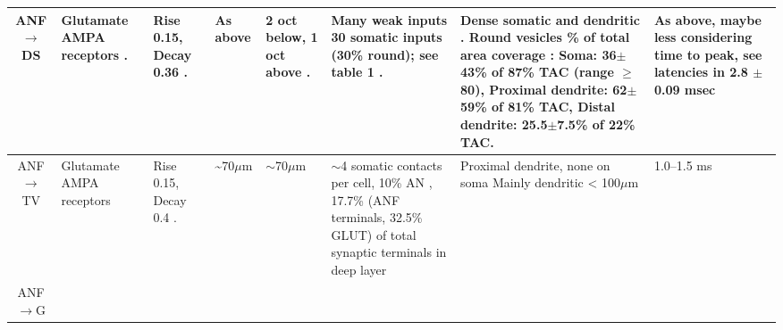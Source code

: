 \begin{longtable}{cYYYYYYY}
\\ \midrule
ANF\ensuremath{\rightarrow}DS                   
& %
Glutamate AMPA receptors \citep{FerragamoGoldingEtAl:1998a,WentholdHunterEtAl:1993}.
& %
Rise 0.15, Decay 0.36 \citep{GardnerTrussellEtAl:1999,Oertel:1983}.  
& %
As above
& %
2 oct below, 1 oct above \citep{PalmerJiangEtAl:1996}. 
& %
Many weak inputs \citep{FerragamoGoldingEtAl:1998a} 
30 somatic inputs (30\% round); see table 1 \citep{SmithRhode:1989}.
& %
Dense somatic and dendritic \citep{Cant:1981,Cant:1982,RyugoWrightEtAl:1993}.
Round vesicles \% of total area coverage \citep[cat][]{SmithRhode:1989}:
Soma: 36$\pm$43\%  of 87\% TAC (range $\geq$80), 
Proximal dendrite: 62$\pm$59\%  of 81\% TAC, 
Distal dendrite: 25.5$\pm$7.5\%  of 22\% TAC. 
& %
As above, maybe less considering time to peak,
see latencies in \citep{PaoliniClark:1999} 
2.8 $\pm$0.09 msec \citep[Oc FSL latency][]{RhodeSmith:1986} 
\\ \midrule
ANF \ensuremath{\rightarrow}TV          
& %
Glutamate AMPA receptors \citep{ZhangOertel:1993}                          
& %
Rise 0.15, Decay 0.4 \citep{GardnerTrussellEtAl:1999}.
& %
\~{}70$\mu$m \citep[mouse][]{SpirouDavisEtAl:1999}
& %
$\sim$70$\mu$m \citep[mouse][]{ZhangOertel:1993,SpirouDavisEtAl:1999}
& %
$\sim$4 somatic contacts per cell, 10\% AN \citep[guinea pig][]{Alibardi:1999}, 
17.7\% (ANF terminals, 32.5\% GLUT) of total synaptic terminals in deep layer \citep[rat][]{RubioJuiz:2004}
& %
Proximal dendrite, none on soma \citep[rat][]{RubioJuiz:2004}  
Mainly dendritic {\textless} 100$\mu$m \citep{Alibardi:1999,Liberman:1993,SpirouDavisEtAl:1999}
& %
1.0--1.5 ms \citep{ZhangOertel:1993,Rhode:1999,SpirouDavisEtAl:1999}
\\ \midrule
ANF\ensuremath{\rightarrow}G                      

\end{longtable}
